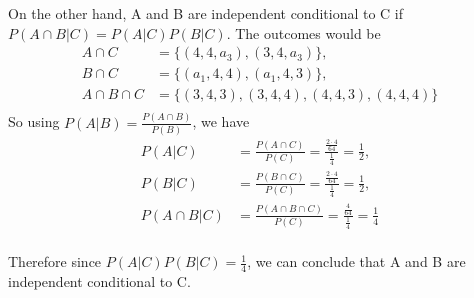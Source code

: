 On the other hand, A and B are independent conditional to C if $P(A \cap B | C) = P(A | C)P(B | C)$. The outcomes would be
\begin{align*}
	A \cap C        & = \{(4, 4, a_3), (3, 4, a_3)\},                \\
	B \cap C        & = \{(a_1, 4, 4), (a_1, 4, 3)\},                \\
	A \cap B \cap C & = \{(3, 4, 3), (3, 4, 4), (4, 4, 3), (4,4,4)\} \\
\end{align*}
So using $P(A|B) = \frac{P(A \cap B)}{P(B)}$, we have
\begin{align*}
	P(A | C)        & = \frac{P(A \cap C)}{P(C)} = \frac{\frac{2\cdot 4}{64}}{\frac{1}{4}} = \frac{1}{2}, \\
	P(B | C)        & = \frac{P(B \cap C)}{P(C)} = \frac{\frac{2\cdot 4}{64}}{\frac{1}{4}} = \frac{1}{2}, \\
	P(A \cap B | C) & = \frac{P(A \cap B \cap C)}{P(C)} = \frac{\frac{4}{64}}{\frac{1}{4}} = \frac{1}{4}  \\
\end{align*}

Therefore since $P(A | C)P(B | C) = \frac{1}{4}$, we can conclude that A and B are independent conditional to C.


